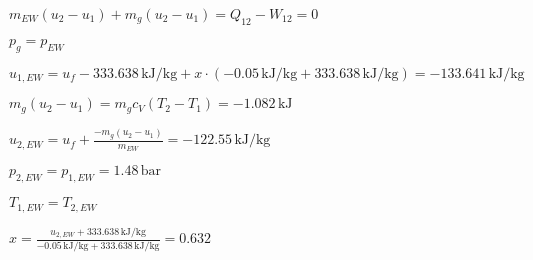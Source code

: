 \( m_{EW} (u_2 - u_1) + m_g (u_2 - u_1) = Q_{12} - W_{12} = 0 \)  

\( p_g = p_{EW} \)  

\( u_{1,EW} = u_{f} - 333.638 \, \text{kJ/kg} + x \cdot (-0.05 \, \text{kJ/kg} + 333.638 \, \text{kJ/kg}) = -133.641 \, \text{kJ/kg} \)  

\( m_g (u_2 - u_1) = m_g c_V (T_2 - T_1) = -1.082 \, \text{kJ} \)  

\( u_{2,EW} = u_{f} + \frac{-m_g (u_2 - u_1)}{m_{EW}} = -122.55 \, \text{kJ/kg} \)  

\( p_{2,EW} = p_{1,EW} = 1.48 \, \text{bar} \)  

\( T_{1,EW} = T_{2,EW} \)  

\( x = \frac{u_{2,EW} + 333.638 \, \text{kJ/kg}}{-0.05 \, \text{kJ/kg} + 333.638 \, \text{kJ/kg}} = 0.632 \)